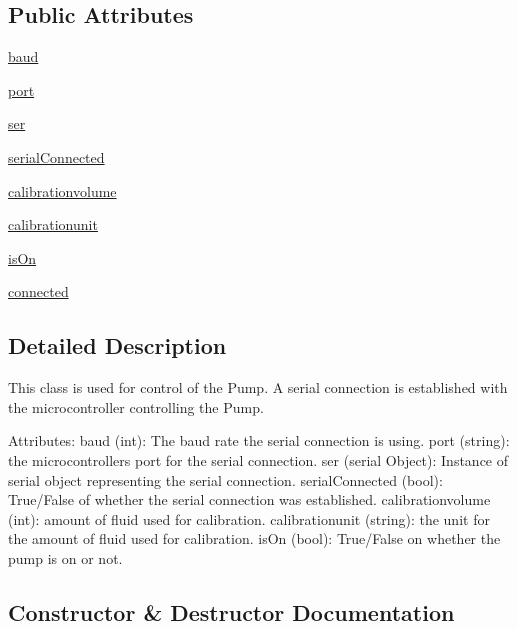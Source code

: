 \subsection*{Public Attributes}
\begin{DoxyCompactItemize}
\item 
\mbox{\hyperlink{class_pump_1_1_three_pump_abc5f0f88b998c6ffbcac39f509f8276d}{baud}}
\item 
\mbox{\hyperlink{class_pump_1_1_three_pump_a0ac7dc541ee013051f95f0f0e1f135bb}{port}}
\item 
\mbox{\hyperlink{class_pump_1_1_three_pump_affc15ae738d1b9a9f6c330314138a8be}{ser}}
\item 
\mbox{\hyperlink{class_pump_1_1_three_pump_a3fe83154cc2e42c20cf211fd812db5e9}{serial\+Connected}}
\item 
\mbox{\hyperlink{class_pump_1_1_three_pump_a6f8e620481c8705f1dd6f1886e28631a}{calibrationvolume}}
\item 
\mbox{\hyperlink{class_pump_1_1_three_pump_ab39d6d2b1f6e88050284dc1d6674c5c2}{calibrationunit}}
\item 
\mbox{\hyperlink{class_pump_1_1_three_pump_a78f3c8cc148540b9d31d61a6728ca5c4}{is\+On}}
\item 
\mbox{\hyperlink{class_pump_1_1_three_pump_a9a86481d8a79b60e2a859fe64f029e83}{connected}}
\end{DoxyCompactItemize}


\subsection{Detailed Description}
\begin{DoxyVerb}This class is used for control of the Pump. A serial connection is established with the microcontroller controlling the Pump.

Attributes:
    baud (int): The baud rate the serial connection is using.
    port (string): the microcontrollers port for the serial connection.
    ser (serial Object): Instance of serial object representing the serial connection.
    serialConnected (bool): True/False of whether the serial connection was established.
    calibrationvolume (int): amount of fluid used for calibration.
    calibrationunit (string): the unit for the amount of fluid used for calibration.
    isOn (bool): True/False on whether the pump is on or not.\end{DoxyVerb}
 

\subsection{Constructor \& Destructor Documentation}
\mbox{\label{class_pump_1_1_three_pump_a5b920fdc4f8e16fb17dee7ca99586bf9}} 
